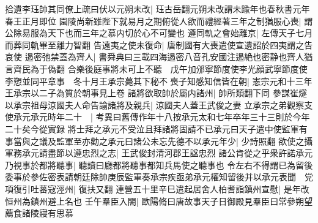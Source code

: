 拾遺李珏帥其同僚上疏曰伏以元朔未改|{
	珏古岳翻元朔未改謂未踰年也春秋書元年春王正月即位}
園陵尚新雖陛下就易月之期俯從人欲而禮經著三年之制猶服心喪|{
	謂公除易服為天下也而三年之慕内切於心不可變也}
遵同軌之會始離京|{
	左傳天子七月而葬同軌畢至離力智翻}
告遠夷之使未復命|{
	唐制國有大喪遣使宣遺詔於四夷謂之告哀使}
遏密弛禁蓋為齊人|{
	書舜典曰三載四海遏密八音孔安國注遏絶也密静也齊人猶言齊民為于偽翻}
合樂後庭事將未可上不聽　戊午加邠寧節度使李光顔武寧節度使李愬並同平章事　冬十月王承宗薨其下秘不喪子知感知信皆在朝|{
	憲宗元和十三年王承宗以二子為質於朝事見上卷}
諸將欲取帥於屬内諸州|{
	帥所類翻下同}
參謀崔燧以承宗祖母涼國夫人命告諭諸將及親兵|{
	涼國夫人蓋王武俊之妻}
立承宗之弟觀察支使承元承元時年二十　|{
	考異曰舊傳作年十八按承元太和七年卒年三十三則於今年二十矣今從實録}
將士拜之承元不受泣且拜諸將固請不已承元曰天子遣中使監軍有事當與之議及監軍至亦勸之承元曰諸公未忘先德不以承元年少|{
	少詩照翻}
欲使之攝軍務承元請盡節以遵忠烈之志|{
	王武俊封清河郡王諡忠烈}
諸公肯從之乎衆許諾承元乃視事於都將聽事|{
	聽讀曰廳都將聽事都知兵馬使之聽事也}
令左右不得謂已為留後委事於參佐密表請朝廷除帥庚辰監軍奏承宗疾亟弟承元權知留後并以承元表聞　党項復引吐蕃寇涇州|{
	復扶又翻}
連營五十里辛巳遣起居舍人柏耆詣鎮州宣慰|{
	是年改恒州為鎮州避上名也}
壬午羣臣入閤|{
	歐陽脩曰唐故事天子日御殿見羣臣曰常參朔望薦食諸陵寢有思慕}


